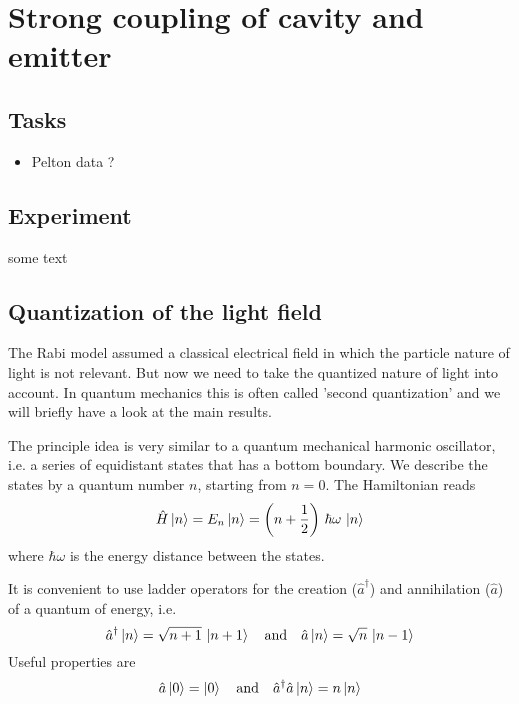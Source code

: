 

\chapter{Strong coupling of cavity and emitter}




\section{Tasks}

\begin{itemize}
\item Pelton data ?
\end{itemize}



\section{Experiment}

some text


\section{Quantization of the light field}
The Rabi model assumed a classical electrical field in which the particle nature of light is not relevant. But now we need to take the quantized nature of light into account. In quantum mechanics this is often called 'second quantization' and we will briefly have a look at the main results.

The principle idea is very similar to a quantum mechanical harmonic oscillator, i.e. a series of equidistant states that has a bottom boundary. We describe the states by a quantum number $n$, starting from $n=0$. The Hamiltonian reads
\[
\hat{H} \ket{n} = E_n \ket{n} = \left( n + \frac{1}{2} \right) \, \hbar \omega \, \ket{n}
\]
where $\hbar \omega$ is the energy distance between the states.

It is convenient to use ladder operators for the creation ($\hat{a}^\dagger$) and annihilation ($\hat{a}$) of  a quantum of energy, i.e.
\[
 \hat{a}^\dagger \ket{n} = \sqrt{n+1}\, \ket{n+1}  \quad \text{and} \quad
  \hat{a} \ket{n} = \sqrt{n}\, \ket{n-1}
\]
Useful properties are 
\[
 \hat{a} \ket{0} = \ket{0}  \quad \text{and} \quad
  \hat{a}^\dagger  \hat{a} \ket{n} = n \ket{n}
\]

